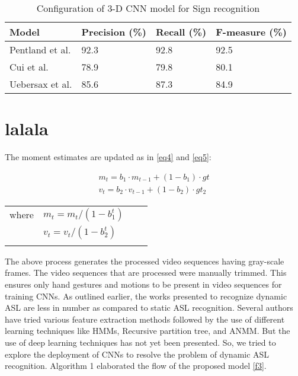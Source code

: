\documentclass[
  manuscript=article,  %
  layout=preprint,  %
  year=20xx,
  volume=x,
]{joas}
\begin{document}
\begin{table}[!ht]
\caption{ Configuration of 3-D CNN model for Sign recognition\label{tab2}}
\begin{tabular*}{\columnwidth}{@{\extracolsep\fill}|l|l|l|l|@{\extracolsep\fill}}
\toprule
Model & Precision (\%) & Recall (\%) & F-measure (\%)\\
\midrule
Pentland et al. & 92.3 & 92.8 & 92.5\\
Cui et al. & 78.9 & 79.8 & 80.1 \\
Uebersax et al. & 85.6 &87.3 & 84.9 \\
\bottomrule
\end{tabular*}
\end{table}






\section{lalala}\label{sec6}

The moment estimates are updated as in \ref{eq4} and \ref{eq5}:


\begin{minipage}[h]{1\textwidth}
\begin{align}
m_{t}=b_{1} \cdot m_{t-1}+(1-b_{1}) \cdot gt\label{eq4} \\ 
v_{t}=b_{2} \cdot v_{t-1}+(1-b_{2}) \cdot gt_{2} \label{eq5}
\end{align}
\begin{tabular}{llll}
    where & $m_{t} = m_{t}/ (1-b^t_{1}) $ \\
    \addlinespace
    & $v_{t} = v_{t}/ (1-b^t_{2}) $ \\
    \addlinespace
\end{tabular}
\end{minipage}

The above process generates the processed video sequences having gray-scale frames. The video sequences that are processed were manually trimmed. This ensures only hand gestures and motions to be present in video sequences for training CNNs. As outlined earlier, the works presented to recognize dynamic ASL are less in number as compared to static ASL recognition. Several authors have tried various feature extraction methods followed by the use of different learning techniques like HMMs, Recursive partition tree, and ANMM. But the use of deep learning techniques has not yet been presented. So, we tried to explore the deployment of CNNs to resolve the problem of dynamic ASL recognition. Algorithm 1 elaborated the flow of the proposed model \ref{f3}.
\end{document}
